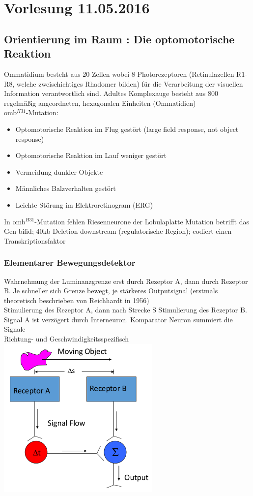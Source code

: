 \section{Vorlesung 11.05.2016}

\subsection{Orientierung im Raum : Die optomotorische Reaktion}

Ommatidium besteht aus 20 Zellen wobei 8 Photorezeptoren (Retinulazellen R1-R8, welche zweischichtiges Rhadomer bilden) für die Verarbeitung der visuellen Information verantwortlich sind. Adultes Komplexauge besteht aus 800 regelmäßig angeordneten, hexagonalen Einheiten (Ommatidien)\\

omb$^{H31}$-Mutation:
\begin{itemize}
	\item Optomotorische Reaktion im Flug gestört (large field response, not object response)
	\item Optomotorische Reaktion im Lauf weniger gestört
	\item Vermeidung dunkler Objekte
	\item Männliches Balzverhalten gestört
	\item Leichte Störung im Elektroretinogram (ERG)
\end{itemize}

In omb$^{H31}$-Mutation fehlen Riesenneurone der Lobulaplatte
Mutation betrifft das Gen bifid; 40kb-Deletion downstream (regulatorische Region); codiert einen Transkriptionsfaktor\\

\subsubsection{Elementarer Bewegungsdetektor}
Wahrnehmung der Luminanzgrenze erst durch Rezeptor A, dann durch Rezeptor B. Je schneller sich Grenze bewegt, je stärkeres Outputsignal (erstmals theoretisch beschrieben von Reichhardt in 1956)\\
Stimulierung des Rezeptor A, dann nach Strecke S Stimulierung des Rezeptor B. Signal A ist verzögert durch Interneuron. Komparator Neuron summiert die Signale\\
Richtung- und Geschwindigkeitsspezifisch\\
\includegraphics[width=0.6\textwidth]{lectures/160511/pix/unidirectional_motiondetection.png}

